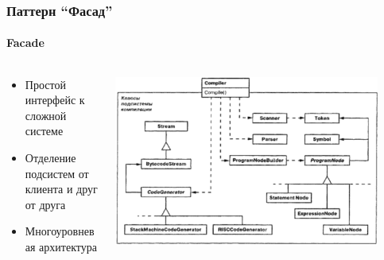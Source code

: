\documentclass{../cscslides}
\begin{document}
    \begin{frame}
        \frametitle{Паттерн ``Фасад''}
        \framesubtitle{Facade}
        \begin{columns}
            \begin{column}{0.4\textwidth}
                \begin{itemize}
                    \item Простой интерфейс к сложной системе
                    \item Отделение подсистем от клиента и друг от друга
                    \item Многоуровневая архитектура
                \end{itemize}
            \end{column}
            \begin{column}{0.6\textwidth}
                \begin{center}
                    \includegraphics[width=0.9\textwidth]{facadeMotivation.png}
                \end{center}
            \end{column}
        \end{columns}
    \end{frame}
\end{document}
